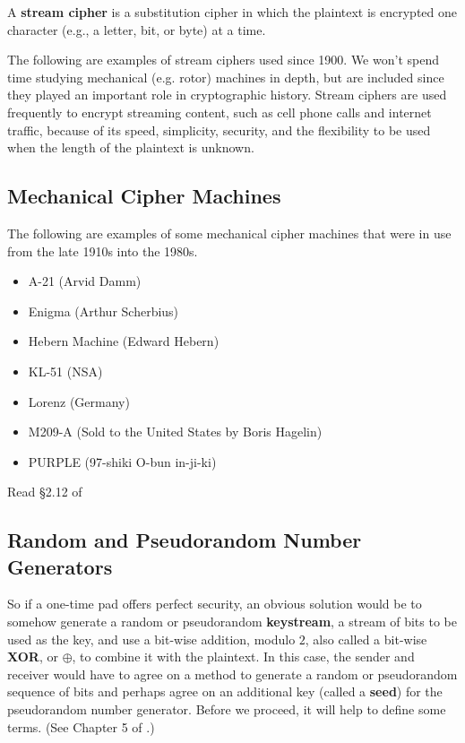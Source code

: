 	\begin{definition}
	A {\bf stream cipher} is a substitution cipher in which the plaintext is encrypted one character (e.g., a letter, bit, or byte) at a time.
	\end{definition}

The following are examples of stream ciphers used since 1900. We won't spend time studying mechanical (e.g. rotor) machines in depth, but are included since they played an important role in cryptographic history.  Stream ciphers are used frequently to encrypt streaming content, such as cell phone calls and internet traffic, because of its speed, simplicity, security, and the flexibility to be used when the length of the plaintext is unknown.

		\subsection{Mechanical Cipher Machines}
		\label{sssec:rotor}

The following are examples of some mechanical cipher machines that were in use from the late 1910s into the 1980s.

		\begin{itemize}
			\item A-21 (Arvid Damm)
			\item Enigma (Arthur Scherbius)
			\item Hebern Machine (Edward Hebern)
			\item KL-51 (NSA)
			\item Lorenz (Germany)
			\item M209-A (Sold to the United States by Boris Hagelin)
			\item PURPLE (97-shiki O-bun in-ji-ki)
		\end{itemize}

	Read \S 2.12 of \cite{tw}

		\subsection{Random and Pseudorandom Number Generators}

So if a one-time pad  offers perfect security, an obvious solution would be to somehow generate a random or pseudorandom {\bf keystream},  a stream of bits to be used as the key, and use a bit-wise addition, modulo $2$, also called a bit-wise {\bf XOR},  or $\oplus$, to combine it with the plaintext. In this case, the sender and receiver would have to agree on a method to generate a random or pseudorandom sequence of bits and perhaps agree on an additional key (called a {\bf seed}) for the pseudorandom number generator. Before we proceed, it will help to define some terms. (See Chapter 5 of \cite{hac}.)

